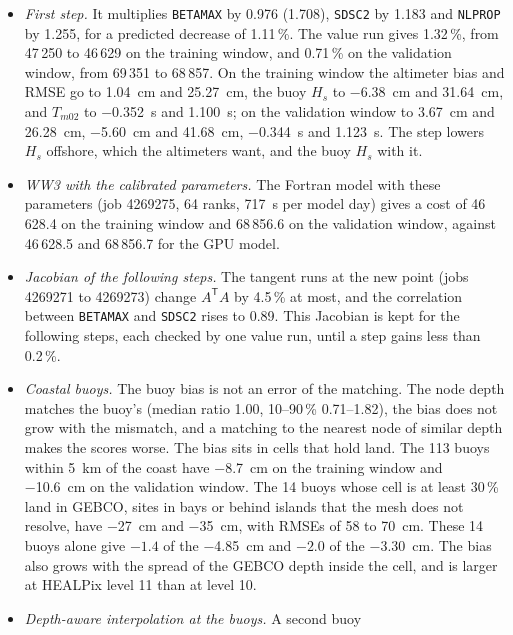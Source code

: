 \documentclass[11pt,a4paper]{article}
\begin{document}
\begin{itemize}
lowered the cost by 0.80\,\%, but \texttt{BJGAM}, whose tangent is also
the least reliable, was then kept at 0.73 and the step recomputed with
the three other parameters from the same tangent runs.
\item \emph{First step.} It multiplies \texttt{BETAMAX} by 0.976 (1.708),
\texttt{SDSC2} by 1.183 and \texttt{NLPROP} by 1.255, for a predicted
decrease of 1.11\,\%. The value run gives 1.32\,\%, from 47\,250 to
46\,629 on the training window, and 0.71\,\% on the validation window,
from 69\,351 to 68\,857. On the training window the altimeter bias and
RMSE go to \SI{+1.04}{cm} and \SI{25.27}{cm}, the buoy $H_s$ to
\SI{-6.38}{cm} and \SI{31.64}{cm}, and $T_{m02}$ to \SI{-0.352}{s} and
\SI{1.100}{s}; on the validation window to \SI{+3.67}{cm} and
\SI{26.28}{cm}, \SI{-5.60}{cm} and \SI{41.68}{cm}, \SI{-0.344}{s} and
\SI{1.123}{s}. The step lowers $H_s$ offshore, which the altimeters
want, and the buoy $H_s$ with it.
\item \emph{WW3 with the calibrated parameters.} The Fortran model with
these parameters (job 4269275, 64 ranks, \SI{717}{s} per model day)
gives a cost of 46\,628.4 on the training window and 68\,856.6 on the
validation window, against 46\,628.5 and 68\,856.7 for the GPU model.
\item \emph{Jacobian of the following steps.} The tangent runs at the
new point (jobs 4269271 to 4269273) change $A^\mathsf{T}A$ by 4.5\,\% at
most, and the correlation between \texttt{BETAMAX} and \texttt{SDSC2}
rises to 0.89. This Jacobian is kept for the following steps, each
checked by one value run, until a step gains less than 0.2\,\%.
\item \emph{Coastal buoys.} The buoy bias is not an error of the
matching. The node depth matches the buoy's (median ratio 1.00, 10--90\,\%
0.71--1.82), the bias does not grow with the mismatch, and a matching to
the nearest node of similar depth makes the scores worse. The bias sits
in cells that hold land. The 113 buoys within \SI{5}{km} of the coast
have \SI{-8.7}{cm} on the training window and \SI{-10.6}{cm} on the
validation window. The 14 buoys whose cell is at least 30\,\% land in
GEBCO, sites in bays or behind islands that the mesh does not resolve,
have \SI{-27}{cm} and \SI{-35}{cm}, with RMSEs of 58 to \SI{70}{cm}.
These 14 buoys alone give $-1.4$ of the \SI{-4.85}{cm} and $-2.0$ of the
\SI{-3.30}{cm}. The bias also grows with the spread of the GEBCO depth
inside the cell, and is larger at HEALPix level 11 than at level 10.
\item \emph{Depth-aware interpolation at the buoys.} A second buoy

\end{itemize}
\end{document}
